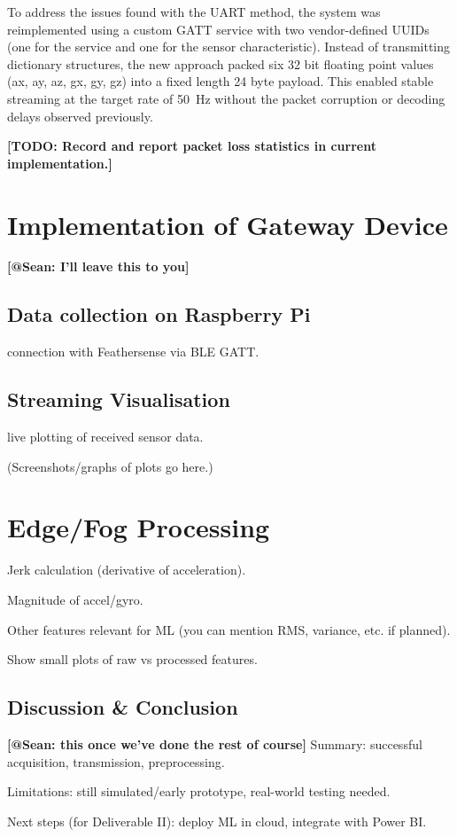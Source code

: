 \documentclass[conference]{IEEEtran}
\begin{document}
To address the issues found with the UART method, the system was reimplemented using a custom GATT service with two vendor-defined UUIDs (one for the service and one for the sensor characteristic). Instead of transmitting dictionary structures, the new approach packed six 32 bit floating point values (ax, ay, az, gx, gy, gz) into a fixed length 24 byte payload. This enabled stable streaming at the target rate of 50~Hz without the packet corruption or decoding delays observed previously.

\textbf{[TODO: Record and report packet loss statistics in current implementation.]} 




\section{Implementation of Gateway Device}
\textbf{[@Sean: I'll leave this to you]} 
\subsection{Data collection on Raspberry Pi}
connection with Feathersense via BLE GATT.

\subsection{Streaming Visualisation}
 live plotting of received sensor data.

(Screenshots/graphs of plots go here.)

\section{Edge/Fog Processing}
Jerk calculation (derivative of acceleration).

Magnitude of accel/gyro.

Other features relevant for ML (you can mention RMS, variance, etc. if planned).

Show small plots of raw vs processed features.


\subsection{Discussion \& Conclusion}
\textbf{[@Sean: this once we've done the rest of course]} 
Summary: successful acquisition, transmission, preprocessing.

Limitations: still simulated/early prototype, real-world testing needed.

Next steps (for Deliverable II): deploy ML in cloud, integrate with Power BI.



\end{document}
